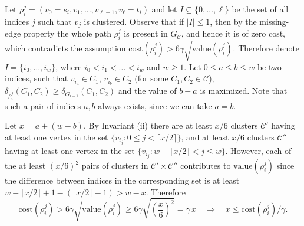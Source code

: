 \documentclass[a4paper,11pt]{article}
\theoremstyle{definition}
\newcommand{\dist}{\delta}
\newcommand{\cost}{\mathrm{cost}}
\newcommand{\val}{\mathrm{value}}
\newcommand{\cC}{\mathcal{C}}
\begin{document}
Let $\rho_i^j=(v_0=s_i,v_1,\ldots,v_{\ell-1},v_{\ell}=t_i)$
and let $I \subseteq \{0,\ldots, \ell\}$ be the set of all indices
$j$ such that $v_j$ is clustered.
Observe that if $|I| \le 1$, then by the missing-edge property
the whole path $\rho_i^j$ is present in $G_\cC$, and hence it 
is of zero cost, which contradicts the assumption
$\cost(\rho_i^j) > 6\gamma\sqrt{\val(\rho_i^j)}$.
Therefore denote $I = \{i_0,\ldots,i_w\}$, where $i_0 < i_1 < \ldots < i_w$ and $w \ge 1$. Let $0 \le a \le b \le w$ be two indices,
such that $v_{i_a} \in C_1$, $v_{i_b} \in C_2$ (for some $C_1, C_2 \in \cC$),
$\dist_{\rho_i^j}(C_1, C_2) \ge \dist_{G_{i-1}}(C_1,C_2)$ and the value of $b-a$ is maximized.
Note that such a pair of indices $a,b$ always exists, since we can take $a=b$.

Let $x=a+(w-b)$. By Invariant (ii) there are at least $x/6$ clusters $\cC'$ having at least 
one vertex in the set $\{v_{i_j} : 0 \le j < \lceil x/2 \rceil\}$,
and at least $x/6$ clusters $\cC''$ having at least one vertex 
in the set $\{v_{i_j} : w-\lceil x/2 \rceil < j \le w\}$.
However, each of the at least $(x/6)^2$ pairs of clusters in $\cC'\times \cC''$ contributes to $\val(\rho^j_i)$ since the difference between indices in the corresponding set is at least 
$w-\lceil x/2 \rceil + 1 - (\lceil x/2 \rceil - 1) > w-x$.
Therefore 
\begin{equation}
\cost(\rho_i^j) > 6\gamma \sqrt{\val(\rho^j_i)}\geq 6 \gamma \sqrt{\left(\frac{x}{6}\right)^2}=\gamma\,x\quad \Rightarrow \quad x  \le \cost(\rho_i^j)/\gamma.\label{eqn:pairwise2}
\end{equation}
\end{document}
